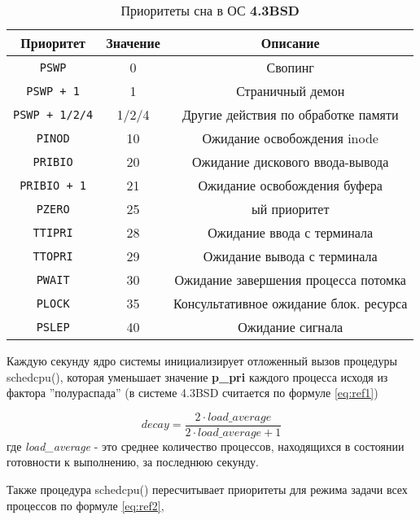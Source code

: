 \begin{table}
	\caption{Приоритеты
		сна в ОС \textbf{4.3BSD}}
	\label{tab:bsd}
	\begin{center}
		\begin{tabular}{ |c|c|c|  }
			\hline
			\textbf{Приоритет} & \textbf{Значение} & \textbf{Описание} \\
			\hline
			\texttt{PSWP} & 0 & Свопинг \\
			\hline
			\texttt{PSWP + 1} & 1 & Страничный демон \\
			\hline
			\texttt{PSWP + 1/2/4} & 1/2/4 & Другие действия по обработке памяти \\
			\hline
			\texttt{PINOD} & 10 & Ожидание освобождения inode \\
			\hline
			\texttt{PRIBIO} & 20 & Ожидание дискового ввода-вывода \\
			\hline
			\texttt{PRIBIO + 1} & 21 & Ожидание освобождения буфера \\
			\hline
			\texttt{PZERO} & 25 & ый приоритет \\
			\hline
			\texttt{TTIPRI} & 28 & Ожидание ввода с терминала \\
			\hline
			\texttt{TTOPRI} & 29 & Ожидание вывода с терминала \\
			\hline 
			\texttt{PWAIT} & 30 & Ожидание завершения процесса потомка \\
			\hline
			\texttt{PLOCK} & 35 & Консультативное ожидание блок. ресурса \\
			\hline
			\texttt{PSLEP} & 40 & Ожидание сигнала \\
			\hline
		\end{tabular}
	\end{center}
\end{table}

Каждую секунду ядро системы инициализирует отложенный вызов процедуры schedcpu(), которая уменьшает значение \textbf{p\_pri} каждого процесса исходя из фактора ''полураспада'' (в системе 4.3BSD считается по формуле \ref{eq:ref1})

\begin{equation}
\label{eq:ref1}
decay = \frac{2 \cdot load\_average}{2 \cdot load\_average + 1}
\end{equation} где
\textit{load\_average} - это среднее количество процессов, находящихся в состоянии готовности к выполнению, за последнюю секунду.

Также процедура schedcpu() пересчитывает приоритеты для режима задачи
всех процессов по формуле \ref{eq:ref2},


